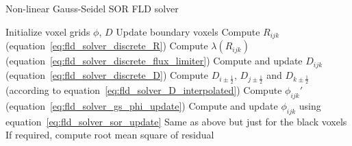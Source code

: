 \begin{algorithm}[!ht]
\caption{Non-linear Gauss-Seidel SOR FLD solver}
\begin{algorithmic}
\State Initialize voxel grids $\phi$, $D$
\Repeat
    \State Update boundary voxels
    \State Compute $R_{ijk}$ (equation~\ref{eq:fld_solver_discrete_R})
    \State Compute $\lambda\left(R_{ijk}\right)$ (equation~\ref{eq:fld_solver_discrete_flux_limiter})
    \State Compute and update $D_{ijk}$ (equation~\ref{eq:fld_solver_discrete_D})
    \State Compute $D_{i\pm\frac{1}{2}}$, $D_{j\pm\frac{1}{2}}$ and $D_{k\pm\frac{1}{2}}$ (according to equation~\ref{eq:fld_solver_D_interpolated})
    \State Compute $\phi_{ijk}'$ (equation~\ref{eq:fld_solver_gs_phi_update})
    \State Compute and update $\phi_{ijk}$ using equation~\ref{eq:fld_solver_sor_update}
    \EndParFor
    \State Same as above but just for the black voxels
    \EndParFor
    \State If required, compute root mean square of residual\;
\end{algorithmic}
\label{algorithm:fld_solver}
\end{algorithm}
